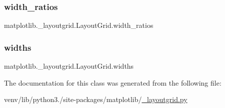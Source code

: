 \subsubsection{\texorpdfstring{width\+\_\+ratios}{width\_ratios}}
{\footnotesize\ttfamily matplotlib.\+\_\+layoutgrid.\+Layout\+Grid.\+width\+\_\+ratios}

\mbox{\label{classmatplotlib_1_1__layoutgrid_1_1LayoutGrid_a0dd8e5aa236c4f907c5c4eef34eef116}} 
\subsubsection{\texorpdfstring{widths}{widths}}
{\footnotesize\ttfamily matplotlib.\+\_\+layoutgrid.\+Layout\+Grid.\+widths}



The documentation for this class was generated from the following file\+:\begin{DoxyCompactItemize}
\item 
venv/lib/python3./site-\/packages/matplotlib/\hyperlink{__layoutgrid_8py}{\+\_\+layoutgrid.\+py}\end{DoxyCompactItemize}

